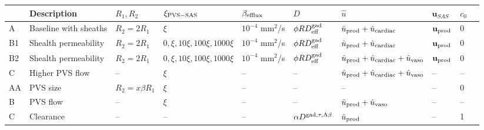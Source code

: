 \documentclass[fleqn,10pt]{wlscirep}
\begin{document}
\begin{table}
  \begin{center}
  \begin{tabular}{ll|llllll|ll}
    \toprule
    & Description & $R_1, R_2$ & $\xi_{\rm PVS-SAS}$ &  $\beta_{\rm efflux}$ & $D$ & $\hat{u}$ & $\mathbf{u}_{SAS}$ & $c_0$ \\
    \midrule
    A & Baseline with sheaths & $R_2 = 2 R_1$ & $\xi$ & $10^{-4}$ mm$^2$/s\cite{hornkjol2022csf} & $\phi R D^{\rm gad}_{\rm eff}$\cite{sykova2008diffusion, valnes2020apparent} & $\hat{u}_{\rm prod} + \hat{u}_{\rm cardiac}$ & $\mathbf{u}_{\rm prod}$ & 0 \\ 
    B1 & Shealth permeability & $R_2 = 2 R_1$ & $0, \xi, 10 \xi, 100 \xi, 1000 \xi$ & $10^{-4}$ mm$^2$/s\cite{hornkjol2022csf} & $\phi R D^{\rm gad}_{\rm eff}$\cite{sykova2008diffusion, valnes2020apparent} & $\hat{u}_{\rm prod} + \hat{u}_{\rm cardiac}$ & $\mathbf{u}_{\rm prod}$ & 0 \\ 
    B2 & Shealth permeability & $R_2 = 2 R_1$ & $0, \xi, 10 \xi, 100 \xi, 1000 \xi$ & $10^{-4}$ mm$^2$/s\cite{hornkjol2022csf} & $\phi R D^{\rm gad}_{\rm eff}$\cite{sykova2008diffusion, valnes2020apparent} & $\hat{u}_{\rm prod} +  \hat{u}_{\rm cardiac} + \hat{u}_{\rm vaso}$ & $\mathbf{u}_{\rm prod}$ & 0 \\ 
    C & Higher PVS flow & -- & $\xi$ & -- & --  & $\hat{u}_{\rm prod} +  \hat{u}_{\rm cardiac} + \hat{u}_{\rm vaso}$  & -- & --  \\
    AA & PVS size & $R_2 = x \beta R_1$ & $\xi$ & -- & -- & -- &  -- & 0 \\ 
    B & PVS flow & -- & $\xi$ & -- & --  & $\hat{u}_{\rm prod} + \hat{u}_{\rm vaso}$  & -- & --  \\
    C & Clearance & -- & -- & -- & $\alpha D^{\rm gad, \tau, A\beta}$  & $\hat{u}_{\rm prod}$ & -- & 1 \\

\end{tabular}
\end{center}
\end{table}
\end{document}
